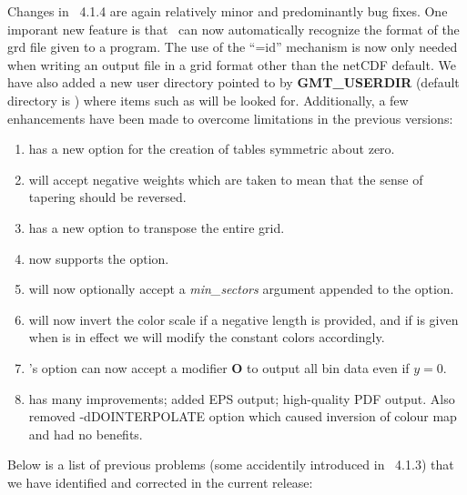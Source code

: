 Changes in \GMT\ 4.1.4 are again relatively minor and predominantly bug fixes.  One imporant
new feature is that \GMT\ can now automatically recognize the format of the grd file given
to a program.  The use of the ``=id'' mechanism is now only needed when writing an output file in
a grid format other than the netCDF default.  We have also added
a new user directory pointed to by {\bf GMT\_USERDIR} (default directory is )
where items such as  will be looked for.  Additionally, a few enhancements
have been made to overcome limitations in the previous versions:

\begin{enumerate}
\item {} has a new option  for the creation of tables symmetric about zero.
\item {} will accept negative weights which are taken to mean that the sense of tapering should be reversed.
\item {} has a new option  to transpose the entire grid.
\item {} now supports the  option.
\item {} will now optionally accept a {\it min\_sectors} argument appended to the  option.
\item {} will now invert the color scale if a negative length is provided, and if
 is given when  is in effect we will modify the constant colors accordingly.
\item {}'s option  can now accept a modifier {\bf O} to output all bin data even if $y = 0$.
\item {} has many improvements; added EPS output; high-quality PDF output.
Also removed -dDOINTERPOLATE option which caused inversion of colour map and had no benefits.
\end{enumerate}

Below is a list of previous problems (some accidentily introduced in \gmt\ 4.1.3)
that we have identified and corrected in the current release:

